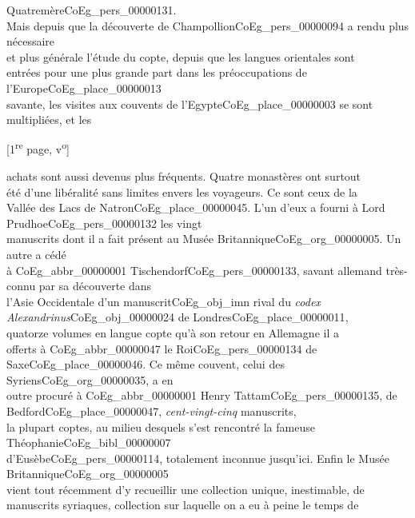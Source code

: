\documentclass{book}
\begin{document}
Quatremère\gls{CoEg_pers_00000131}.\\
\indent Mais depuis que la découverte de Champollion\gls{CoEg_pers_00000094} a rendu plus nécessaire\\
et plus générale l’étude du copte, depuis que les langues orientales sont\\
entrées pour une plus grande part dans les préoccupations de l’Europe\gls{CoEg_place_00000013}\\
savante, les visites aux couvents de l’Egypte\gls{CoEg_place_00000003} se sont multipliées, et les
{\footnotesize \begin{center} {[1\textsuperscript{re} page, v\textsuperscript{o}]}\end{center}}
\noindent achats sont aussi devenus plus fréquents. Quatre monastères ont surtout\\
été d’une libéralité sans limites envers les voyageurs. Ce sont ceux de la\\
Vallée des Lacs de Natron\gls{CoEg_place_00000045}. L’un d’eux a fourni à Lord Prudhoe\gls{CoEg_pers_00000132} les vingt\\
manuscrits dont il a fait présent au Musée Britannique\gls{CoEg_org_00000005}. Un autre a cédé\\
à \gls{CoEg_abbr_00000001} Tischendorf\gls{CoEg_pers_00000133}, savant allemand très-connu par sa découverte dans\\
l’Asie Occidentale d’un manuscrit\gls{CoEg_obj_imn} rival du \textit{codex Alexandrinus}\gls{CoEg_obj_00000024} de Londres\gls{CoEg_place_00000011},\\
quatorze volumes en langue copte qu’à son retour en Allemagne il a\\
offerts à \gls{CoEg_abbr_00000047} le Roi\gls{CoEg_pers_00000134} de Saxe\gls{CoEg_place_00000046}. Ce même couvent, celui des Syriens\gls{CoEg_org_00000035}, a en\\
outre procuré à \gls{CoEg_abbr_00000001} Henry Tattam\gls{CoEg_pers_00000135}, de Bedford\gls{CoEg_place_00000047}, \textit{cent-vingt-cinq} manuscrits,\\
la plupart coptes, au milieu desquels s’est rencontré la fameuse Théophanie\gls{CoEg_bibl_00000007}\\
d’Eusèbe\gls{CoEg_pers_00000114}, totalement inconnue jusqu’ici. Enfin le Musée Britannique\gls{CoEg_org_00000005}\\
vient tout récemment d’y recueillir une collection unique, inestimable, de\\
manuscrits syriaques, collection sur laquelle on a eu à peine le temps de\\
\end{document}
